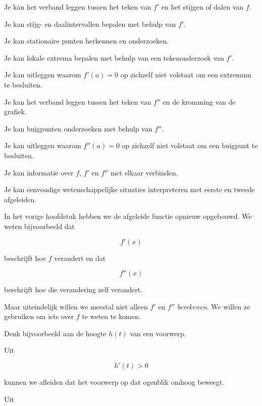 \documentclass{ximera}
\begin{document}
  \begin{leerdoelen}
    \item Je kan het verband leggen tussen het teken van $f'$ en het stijgen of dalen van $f$.
    \item Je kan stijg- en daalintervallen bepalen met behulp van $f'$.
    \item Je kan stationaire punten herkennen en onderzoeken.
    \item Je kan lokale extrema bepalen met behulp van een tekenonderzoek van $f'$.
    \item Je kan uitleggen waarom $f'(a)=0$ op zichzelf niet volstaat om een extremum te besluiten.
    \item Je kan het verband leggen tussen het teken van $f''$ en de kromming van de grafiek.
    \item Je kan buigpunten onderzoeken met behulp van $f''$.
    \item Je kan uitleggen waarom $f''(a)=0$ op zichzelf niet volstaat om een buigpunt te besluiten.
    \item Je kan informatie over $f$, $f'$ en $f''$ met elkaar verbinden.
    \item Je kan eenvoudige wetenschappelijke situaties interpreteren met eerste en tweede afgeleiden.
  \end{leerdoelen}



In het vorige hoofdstuk hebben we de afgeleide functie opnieuw
opgebouwd. We weten bijvoorbeeld dat

\[
f'(x)
\]

beschrijft hoe $f$ verandert en dat

\[
f''(x)
\]

beschrijft hoe die verandering zelf verandert.

Maar uiteindelijk willen we meestal niet alleen $f'$ en $f''$
\emph{berekenen}. We willen ze gebruiken om iets over $f$ te weten
te komen.

Denk bijvoorbeeld aan de hoogte $h(t)$ van een voorwerp.

Uit

\[
h'(t)>0
\]

kunnen we afleiden dat het voorwerp op dat ogenblik omhoog beweegt.

Uit
\end{document}
